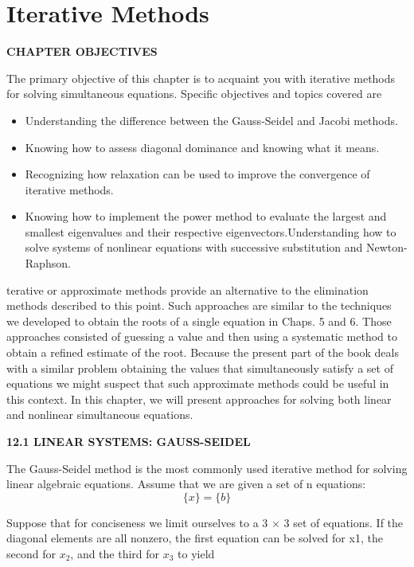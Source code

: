 \documentclass[../main.tex]{subfiles}
\begin{document}
\chapter{Iterative Methods}
\begin{center}
\textbf{CHAPTER OBJECTIVES}
\end{center}
The primary objective of this chapter is to acquaint you with iterative methods for
solving simultaneous equations. Specific objectives and topics covered are
\begin{itemize}
\item Understanding the difference between the Gauss-Seidel and Jacobi methods.
\item Knowing how to assess diagonal dominance and knowing what it means.
\item Recognizing how relaxation can be used to improve the convergence of iterative
methods.
\item Knowing how to implement the power method to evaluate the largest and smallest eigenvalues and their respective eigenvectors.Understanding how to solve systems of nonlinear equations with successive
substitution and Newton-Raphson.
\end{itemize}
terative or approximate methods provide an alternative to the elimination methods
described to this point. Such approaches are similar to the techniques we developed to
obtain the roots of a single equation in Chaps. 5 and 6. Those approaches consisted of
guessing a value and then using a systematic method to obtain a refined estimate of the root.
Because the present part of the book deals with a similar problem obtaining the values
that simultaneously satisfy a set of equations we might suspect that such approximate methods could be useful in this context.
In this chapter, we will present approaches for
solving both linear and nonlinear simultaneous equations.

\textbf{12.1 LINEAR SYSTEMS: GAUSS-SEIDEL}

The Gauss-Seidel method is the most commonly used iterative method for solving linear
algebraic equations. Assume that we are given a set of n equations:
\begin{equation}
[A]\{x\}=\{b\}
\end{equation}

Suppose that for conciseness we limit ourselves to a 3 × 3 set of equations. If the diagonal
elements are all nonzero, the first equation can be solved for x1, the second for $x_{2}$, and the third for $x_{3}$ to yield
\end{document}
